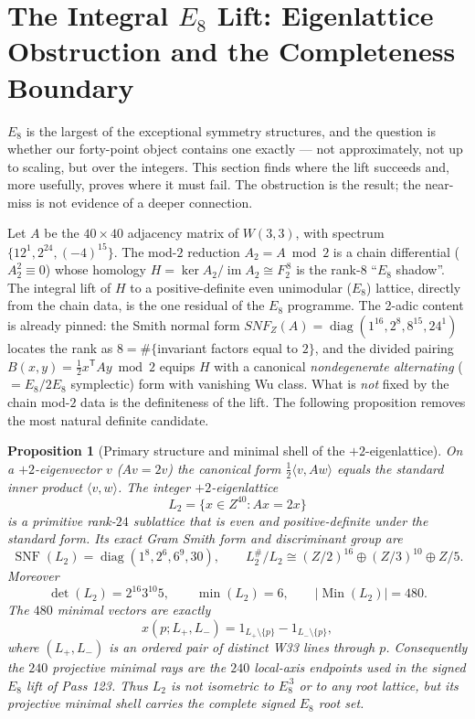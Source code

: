 \documentclass[12pt,a4paper]{article}
\def\mathbb#1{#1}%
\def\mathrm#1{#1}%
\def\mathbf#1{#1}%
\newtheorem{proposition}[theorem]{Proposition}
\theoremstyle{definition}
\begin{document}
\section{The Integral $E_8$ Lift: Eigenlattice Obstruction and the
Completeness Boundary}

\begin{plainbox}
$E_8$ is the largest of the exceptional symmetry structures, and the question is
whether our forty-point object contains one exactly --- not approximately, not up to
scaling, but over the integers. This section finds where the lift succeeds and, more
usefully, proves where it must fail. The obstruction is the result; the near-miss is not
evidence of a deeper connection.
\end{plainbox}

\label{sec:e8-eigenlattice-boundary}

Let $A$ be the $40\times40$ adjacency matrix of $W(3,3)$, with spectrum
$\{12^1,2^{24},(-4)^{15}\}$. The mod-$2$ reduction $A_2=A\bmod 2$ is a chain
differential ($A_2^2\equiv0$) whose homology
$H=\ker A_2/\operatorname{im}A_2\cong\mathbb F_2^{\,8}$ is the rank-$8$ ``$E_8$
shadow''. The integral lift of $H$ to a positive-definite even unimodular
($E_8$) lattice, directly from the chain data, is the one residual of the
$E_8$ programme. The 2-adic content is already pinned: the Smith normal form
$\mathrm{SNF}_{\mathbb Z}(A)=\operatorname{diag}(1^{16},2^{8},8^{15},24^{1})$
locates the rank as $8=\#\{$invariant factors equal to $2\}$, and the divided
pairing $B(x,y)=\tfrac12 x^{\mathsf T}A y\bmod 2$ equips $H$ with a canonical
\emph{nondegenerate alternating} ($=E_8/2E_8$ symplectic) form with vanishing
Wu class. What is \emph{not} fixed by the chain mod-$2$ data is the
definiteness of the lift. The following proposition removes the most natural
definite candidate.

\begin{proposition}[Primary structure and minimal shell of the $+2$-eigenlattice]
\label{prop:eigenlattice-obstruction}
On a $+2$-eigenvector $v$ ($Av=2v$) the canonical form $\tfrac12\langle
v,Aw\rangle$ equals the standard inner product $\langle v,w\rangle$. The
integer $+2$-eigenlattice
\[
  L_2=\{x\in\mathbb Z^{40}: Ax=2x\}
\]
is a primitive rank-$24$ sublattice that is even and positive-definite under
the standard form. Its exact Gram Smith form and discriminant group are
\[
 \operatorname{SNF}(L_2)=\operatorname{diag}(1^8,2^6,6^9,30),
 \qquad
 L_2^\#/L_2\cong
 (\mathbb Z/2)^{16}\oplus(\mathbb Z/3)^{10}\oplus\mathbb Z/5 .
\]
Moreover
\[
 \det(L_2)=2^{16}3^{10}5,\qquad
 \min(L_2)=6,\qquad
 |\operatorname{Min}(L_2)|=480 .
\]
The $480$ minimal vectors are exactly
\[
 x(p;L_+,L_-)=
 \mathbf1_{L_+\setminus\{p\}}-\mathbf1_{L_-\setminus\{p\}},
\]
where $(L_+,L_-)$ is an ordered pair of distinct W33 lines through $p$.
Consequently the $240$ projective minimal rays are the $240$ local-axis
endpoints used in the signed $E_8$ lift of Pass 123. Thus $L_2$ is not
isometric to $E_8^{\,3}$ or to any root lattice, but its projective minimal
shell carries the complete signed $E_8$ root set.
\end{proposition}
\end{document}
